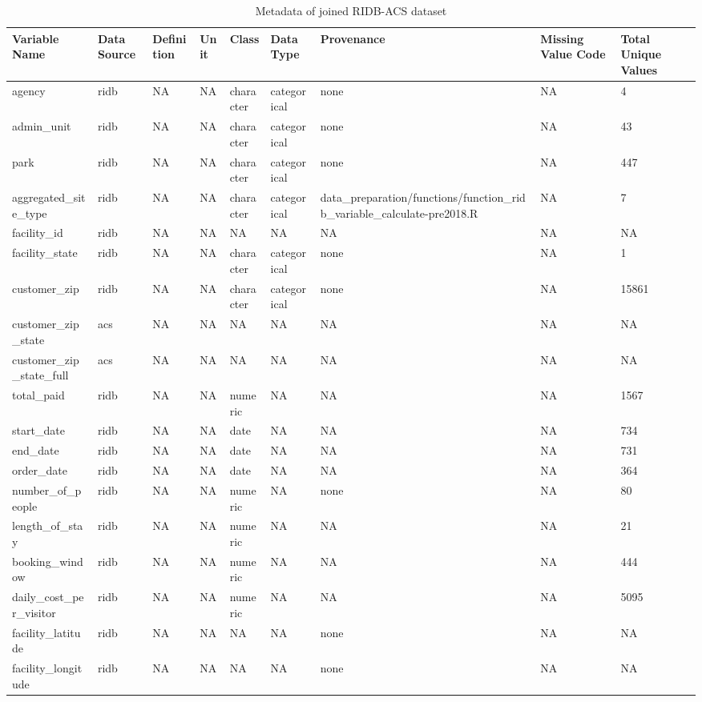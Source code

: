\documentclass[
]{book}
\begin{document}
\begin{table}

\caption{\label{tab:unnamed-chunk-4}Metadata of joined RIDB-ACS dataset}
\begin{tabular}[t]{l|l|l|l|l|l|l|l|l}
\hline
Variable Name & Data Source & Definition & Unit & Class & Data Type & Provenance & Missing Value Code & Total Unique Values\\
\hline
agency & ridb & NA & NA & character & categorical & none & NA & 4\\
\hline
admin\_unit & ridb & NA & NA & character & categorical & none & NA & 43\\
\hline
park & ridb & NA & NA & character & categorical & none & NA & 447\\
\hline
aggregated\_site\_type & ridb & NA & NA & character & categorical & data\_preparation/functions/function\_ridb\_variable\_calculate-pre2018.R & NA & 7\\
\hline
facility\_id & ridb & NA & NA & NA & NA & NA & NA & NA\\
\hline
facility\_state & ridb & NA & NA & character & categorical & none & NA & 1\\
\hline
customer\_zip & ridb & NA & NA & character & categorical & none & NA & 15861\\
\hline
customer\_zip\_state & acs & NA & NA & NA & NA & NA & NA & NA\\
\hline
customer\_zip\_state\_full & acs & NA & NA & NA & NA & NA & NA & NA\\
\hline
total\_paid & ridb & NA & NA & numeric & NA & NA & NA & 1567\\
\hline
start\_date & ridb & NA & NA & date & NA & NA & NA & 734\\
\hline
end\_date & ridb & NA & NA & date & NA & NA & NA & 731\\
\hline
order\_date & ridb & NA & NA & date & NA & NA & NA & 364\\
\hline
number\_of\_people & ridb & NA & NA & numeric & NA & none & NA & 80\\
\hline
length\_of\_stay & ridb & NA & NA & numeric & NA & NA & NA & 21\\
\hline
booking\_window & ridb & NA & NA & numeric & NA & NA & NA & 444\\
\hline
daily\_cost\_per\_visitor & ridb & NA & NA & numeric & NA & NA & NA & 5095\\
\hline
facility\_latitude & ridb & NA & NA & NA & NA & none & NA & NA\\
\hline
facility\_longitude & ridb & NA & NA & NA & NA & none & NA & NA\\

\end{tabular}
\end{table}
\end{document}
